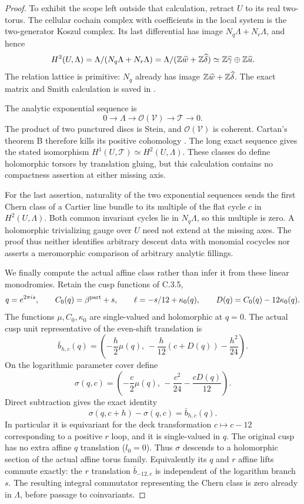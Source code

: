 \begin{proof}
To exhibit the scope left outside that calculation,
retract $U$ to its real two-torus.  The cellular
cochain complex with coefficients in the local
system is the two-generator Koszul complex.
Its last differential has image
$N_q\Lambda+N_r\Lambda$, and hence
\[
 H^2(U,\Lambda)
   =\Lambda/(N_q\Lambda+N_r\Lambda)
   =\Lambda/(\mathbb Z\widehat w+\mathbb Z\widehat\delta)
   \simeq\mathbb Z\widehat\gamma\oplus\mathbb Z\widehat u.
\]
The relation lattice is primitive: $N_q$ already
has image $\mathbb Z\widehat w+\mathbb Z\widehat\delta$.
The exact matrix and Smith calculation is saved
in .

The analytic exponential sequence is
\[
 0\longrightarrow\Lambda\longrightarrow
 \mathcal O(\mathcal V)\longrightarrow
 \mathscr T\longrightarrow0.
\]
The product of two punctured discs is Stein,
and $\mathcal O(\mathcal V)$ is coherent.
Cartan's theorem B therefore kills its positive
cohomology
\citep[Section 5]{Cartan1952B_AB}.
The long exact sequence gives the stated
isomorphism $H^1(U,\mathscr T)\simeq H^2(U,\Lambda)$.
These classes do define holomorphic torsors by
translation gluing, but this calculation contains
no compactness assertion at either missing axis.

For the last assertion, naturality of the two
exponential sequences sends the first Chern class
of a Cartier line bundle to its multiple of the
flat cycle $c$ in $H^2(U,\Lambda)$.  Both common
invariant cycles lie in $N_q\Lambda$, so this
multiple is zero.  A holomorphic trivializing
gauge over $U$ need not extend at the missing
axes.  The proof thus neither identifies
arbitrary descent data with monomial cocycles
nor asserts a meromorphic comparison of
arbitrary analytic fillings.

We finally compute the actual affine class rather
than infer it from these linear monodromies.  Retain
the cusp functions of C.3.5,
\[
 q=e^{2\pi i s},\qquad
 C_0(q)=\beta^{\rm part}+s,\qquad
 \ell=-s/12+\kappa_0(q),
 \qquad D(q)=C_0(q)-12\kappa_0(q).
\]
The functions $\mu,C_0,\kappa_0$ are single-valued
and holomorphic at $q=0$.  The actual cusp unit
representative of the even-shift translation is
\[
 \bar b_{h,c}(q)=
 \left(-\frac h2\mu(q),\,
       -\frac h{12}(c+D(q))-\frac{h^2}{24}\right).
\]
On the logarithmic parameter cover define
\[
 \sigma(q,c)=
 \left(-\frac c2\mu(q),\,
       -\frac{c^2}{24}-\frac{cD(q)}{12}\right).
\]
Direct subtraction gives the exact identity
\[
 \sigma(q,c+h)-\sigma(q,c)=\bar b_{h,c}(q).
\]
In particular it is equivariant for the deck
transformation $c\mapsto c-12$ corresponding to
a positive $r$ loop, and it is single-valued in
$q$.  The original cusp has no extra affine
$q$ translation ($l_0=0$).  Thus $\sigma$ descends
to a holomorphic section of the actual affine
torus family.  Equivalently its $q$ and $r$
affine lifts commute exactly: the $r$ translation
$\bar b_{-12,c}$ is independent of the logarithm
branch $s$.  The resulting integral commutator
representing the Chern class is zero already in
$\Lambda$, before passage to coinvariants.


\end{proof}
